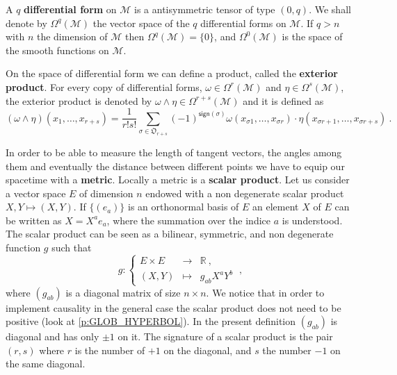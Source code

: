 \documentclass[11pt]{book}
\newcommand{\Mcal}{\mathcal{M}}
\newcommand{\Rbb}{\mathbb{R}}
\newcommand{\Orak}{\mathfrak{O}}
\theoremstyle{break}
\begin{document}
A $q$ \textbf{differential form} on $\Mcal$ is a antisymmetric tensor of type $(0,q)$. We shall denote by $\Omega^q(\Mcal)$ the vector space of the $q$ differential forms on $\Mcal$. If $q > n$ with $n$ the dimension of $\Mcal$ then $\Omega^q(\Mcal)=\{0\}$, and $\Omega^0(\Mcal)$ is the space of the smooth functions on $\Mcal$.


On the space of differential form we can define a product, called the \textbf{exterior product}. For every copy of differential forms, $\omega \in \Omega^r(\Mcal)$ and $\eta \in \Omega^s(\Mcal)$, the exterior product is denoted by 
$\omega \wedge \eta \in \Omega^{r+s}(\Mcal)$ and it is defined  as
%
\begin{equation*}
(\omega \wedge \eta)(x_1,\dots,x_{r+s}) = \frac{1}{r!s!} \sum_{\sigma \in \Orak_{r+s}} (-1)^{\mathsf{sign}(\sigma)} \omega(x_{\sigma{1}},\dots,x_{\sigma{r}}) \cdot \eta(x_{\sigma{r+1}},\dots,x_{\sigma{r+s}}) \ .
\end{equation*}


\bigskip


In order to be able to measure the length of tangent vectors, the angles among them and eventually the distance between different points we have to equip our spacetime with a \textbf{metric}. Locally a metric is a \textbf{scalar product}. Let us consider a vector space $E$ of dimension $n$ endowed with a non degenerate scalar product $X,Y \mapsto (X,Y)$. If $\{(e_a)\}$ is an orthonormal basis of $E$ an element $X$ of $E$ can be written as $X = X^a e_a$, where the summation over the indice $a$ is understood. The scalar product can be seen as a bilinear, symmetric, and non degenerate function $g$ such that
%
\begin{equation*}
g : \left\{ 
\begin{array}{lcl}
E \times E & \to & \Rbb \ , \\
(X,Y) & \mapsto & g_{ab} X^a Y^b
\end{array}
\right. \ ,
\end{equation*}
%
where $(g_{ab})$ is a diagonal matrix of size $n \times n$. We notice that in order to implement causality in the general case the scalar product does not need to be positive (look at \ref{p:GLOB_HYPERBOL}). In the present definition $(g_{ab})$ is diagonal and has only $\pm 1$ on it. The signature of a scalar product is the pair $(r,s)$ where $r$ is the number of $+1$ on the diagonal, and $s$ the number $-1$ on the same diagonal. 
\end{document}
